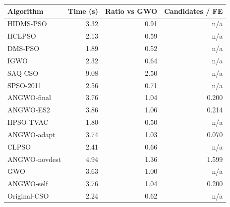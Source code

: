 \begin{tabular}{lrrr}
\toprule
Algorithm & Time (s) & Ratio vs GWO & Candidates / FE\\
\midrule
HIDMS-PSO & 3.32 & 0.91 & n/a \\
HCLPSO & 2.13 & 0.59 & n/a \\
DMS-PSO & 1.89 & 0.52 & n/a \\
IGWO & 2.32 & 0.64 & n/a \\
SAQ-CSO & 9.08 & 2.50 & n/a \\
SPSO-2011 & 2.56 & 0.71 & n/a \\
ANGWO-final & 3.76 & 1.04 & 0.200 \\
ANGWO-ES2 & 3.86 & 1.06 & 0.214 \\
HPSO-TVAC & 1.80 & 0.50 & n/a \\
ANGWO-adapt & 3.74 & 1.03 & 0.070 \\
CLPSO & 2.41 & 0.66 & n/a \\
ANGWO-novdest & 4.94 & 1.36 & 1.599 \\
GWO & 3.63 & 1.00 & n/a \\
ANGWO-self & 3.76 & 1.04 & 0.200 \\
Original-CSO & 2.24 & 0.62 & n/a \\
\bottomrule
\end{tabular}
